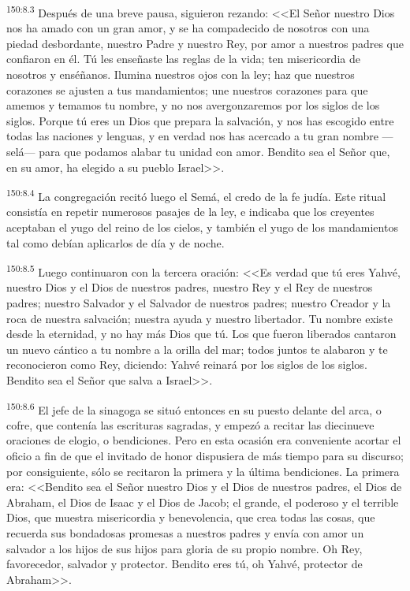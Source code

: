 \par 
\textsuperscript{150:8.3} Después de una breve pausa, siguieron rezando: <<El Señor nuestro Dios nos ha amado con un gran amor, y se ha compadecido de nosotros con una piedad desbordante, nuestro Padre y nuestro Rey, por amor a nuestros padres que confiaron en él. Tú les enseñaste las reglas de la vida; ten misericordia de nosotros y enséñanos. Ilumina nuestros ojos con la ley; haz que nuestros corazones se ajusten a tus mandamientos; une nuestros corazones para que amemos y temamos tu nombre, y no nos avergonzaremos por los siglos de los siglos. Porque tú eres un Dios que prepara la salvación, y nos has escogido entre todas las naciones y lenguas, y en verdad nos has acercado a tu gran nombre ---selá--- para que podamos alabar tu unidad con amor. Bendito sea el Señor que, en su amor, ha elegido a su pueblo Israel>>.

\par 
\textsuperscript{150:8.4} La congregación recitó luego el Semá, el credo de la fe judía. Este ritual consistía en repetir numerosos pasajes de la ley, e indicaba que los creyentes aceptaban el yugo del reino de los cielos, y también el yugo de los mandamientos tal como debían aplicarlos de día y de noche.

\par 
\textsuperscript{150:8.5} Luego continuaron con la tercera oración: <<Es verdad que tú eres Yahvé, nuestro Dios y el Dios de nuestros padres, nuestro Rey y el Rey de nuestros padres; nuestro Salvador y el Salvador de nuestros padres; nuestro Creador y la roca de nuestra salvación; nuestra ayuda y nuestro libertador. Tu nombre existe desde la eternidad, y no hay más Dios que tú. Los que fueron liberados cantaron un nuevo cántico a tu nombre a la orilla del mar; todos juntos te alabaron y te reconocieron como Rey, diciendo: Yahvé reinará por los siglos de los siglos. Bendito sea el Señor que salva a Israel>>.

\par 
\textsuperscript{150:8.6} El jefe de la sinagoga se situó entonces en su puesto delante del arca, o cofre, que contenía las escrituras sagradas, y empezó a recitar las diecinueve oraciones de elogio, o bendiciones. Pero en esta ocasión era conveniente acortar el oficio a fin de que el invitado de honor dispusiera de más tiempo para su discurso; por consiguiente, sólo se recitaron la primera y la última bendiciones. La primera era: <<Bendito sea el Señor nuestro Dios y el Dios de nuestros padres, el Dios de Abraham, el Dios de Isaac y el Dios de Jacob; el grande, el poderoso y el terrible Dios, que muestra misericordia y benevolencia, que crea todas las cosas, que recuerda sus bondadosas promesas a nuestros padres y envía con amor un salvador a los hijos de sus hijos para gloria de su propio nombre. Oh Rey, favorecedor, salvador y protector. Bendito eres tú, oh Yahvé, protector de Abraham>>.

